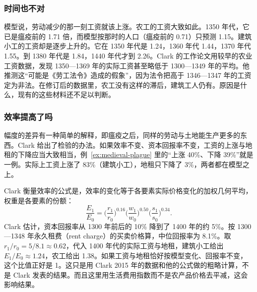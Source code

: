 
\subsubsection{时间也不对}
模型说，劳动减少的那一刻工资就该上涨。农工的工资大致如此。1350 年代，它已是瘟疫前的 1.71 倍，而模型按那时的人口（瘟疫前的 0.71）只预测 1.15。建筑小工的工资却是逐步上升的。它在 1350 年代是 1.24，1360 年代 1.44，1370 年代 1.55。到 1380 年代是 1.84，1440 年代才到 2.26。Clark 的工作论文用较早的农业工资数据，发现 1350—1369 年的实际工资甚至略低于 1300—1349 年的平均。他推测这“可能是《劳工法令》造成的假象”，因为法令把高于 1346—1347 年的工资定为非法\cite{clark1999wp}。在修订后的数据里，农工没有这样的滞后，建筑工人仍有。原因是什么，现有的这些材料还不足以判断。

\subsubsection{效率提高了吗}
幅度的差异有一种简单的解释，即瘟疫之后，同样的劳动与土地能生产更多的东西。Clark 给出了检验的办法。如果效率不变、资本回报率不变，工资的上涨与地租的下降应当大致相当，例~\ref{ex:medieval-plague} 里的“上涨 40\%、下降 39\%”就是一例。实际上工资上涨了 83\%（建筑小工），地租只下降了 3\%，两者都在模型之上。

Clark 衡量效率的公式是，效率的变化等于各要素实际价格变化的加权几何平均，权重是各要素的份额\cite{clark1999wp}：
\[
\frac{E_1}{E_0}=\Big(\frac{r_1}{r_0}\Big)^{0.16}\Big(\frac{w_1}{w_0}\Big)^{0.50}\Big(\frac{s_1}{s_0}\Big)^{0.34} .
\]
Clark 估计，资本回报率从 1300 年前后的 10\% 降到了 1400 年的约 5\%。按 1300—1348 年永久租费（rent charge）的买卖价格算，中位回报率为 8.1\%\cite{clark1999wp}。取 $r_1/r_0=5/8.1\approx0.62$，代入 1400 年代的实际工资与地租，建筑小工给出 $E_1/E_0\approx1.24$，农工给出 1.38。如果工资与地租恰好按模型变化、回报率不变，这个比值正好是 1。这只是用 Clark 2015 年的数据和他的公式做的粗略计算，不是 Clark 发表的结果。而且这里用生活费用指数而不是农产品价格去平减，这会影响结果。

